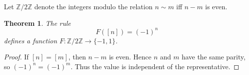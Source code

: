 \documentclass{article}
\newtheorem{theorem}{Theorem}
\begin{document}
Let $\mathbb Z/2\mathbb Z$ denote the integers modulo the relation
$n\sim m$ iff $n-m$ is even.

\begin{theorem}\label{thm:quotient-good}
The rule
\[
  F([n])=(-1)^n
\]
defines a function $F:\mathbb Z/2\mathbb Z\to\{-1,1\}$.
\end{theorem}
\begin{proof}
If $[n]=[m]$, then $n-m$ is even. Hence $n$ and $m$ have the same parity,
so $(-1)^n=(-1)^m$. Thus the value is independent of the representative.
\end{proof}
\end{document}
